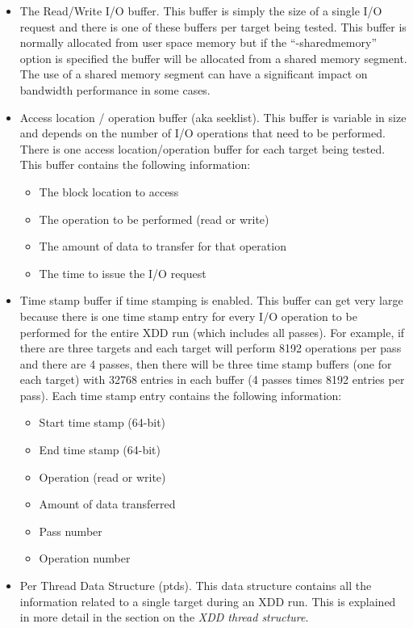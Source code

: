 \begin{itemize}
\item
  The Read/Write I/O buffer. This buffer is simply the size of a single I/O request and there is one of these buffers per target being tested. This buffer is normally allocated from user space memory but if the ``-sharedmemory'' option is specified the buffer will be allocated from a shared memory segment. The use of a shared memory segment can have a significant impact on bandwidth performance in some cases.
\item
  Access location / operation buffer (aka seeklist). This buffer is variable in size and depends on the number of I/O operations that need to be performed. There is one access location/operation buffer for each target being tested. This buffer contains the following information:

  \begin{itemize}
  \item
    The block location to access
  \item
    The operation to be performed (read or write)
  \item
    The amount of data to transfer for that operation
  \item
    The time to issue the I/O request
  \end{itemize}
\item
  Time stamp buffer if time stamping is enabled. This buffer can get very large because there is one time stamp entry for every I/O operation to be performed for the entire XDD run (which includes all passes). For example, if there are three targets and each target will perform 8192 operations per pass and there are 4 passes, then there will be three time stamp buffers (one for each target) with 32768 entries in each buffer (4 passes times 8192 entries per pass). Each time stamp entry contains the following information:

  \begin{itemize}
  \item
    Start time stamp (64-bit)
  \item
    End time stamp (64-bit)
  \item
    Operation (read or write)
  \item
    Amount of data transferred
  \item
    Pass number
  \item
    Operation number
  \end{itemize}
\item
  Per Thread Data Structure (ptds). This data structure contains all the information related to a single target during an XDD run. This is explained in more detail in the section on the \emph{XDD thread structure}.
\end{itemize}

